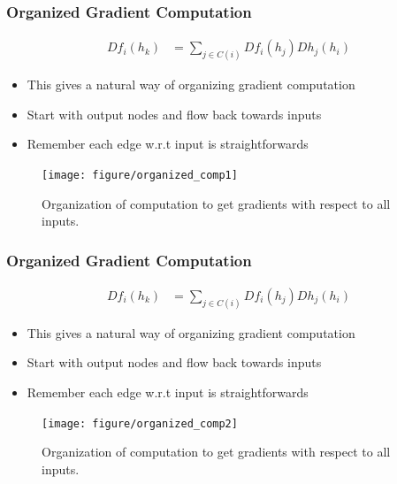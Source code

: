 \documentclass[10pt,mathserif]{beamer}
\begin{document}
\begin{frame}
  \frametitle{Organized Gradient Computation}
  \begin{align*}
    Df_{i}\left(h_k\right) &= \sum_{j \in C\left(i\right)}
    Df_{i}\left(h_{j}\right)Dh_{j}\left(h_{i}\right)
  \end{align*}
  \begin{itemize}
  \item This gives a natural way of organizing gradient computation
  \item Start with output nodes and flow back towards inputs
  \item Remember each edge w.r.t input is straightforwards
  \end{itemize}
  \begin{figure}[ht]
    \centering
    \texttt{[image: figure/organized\_comp1]}
    \caption{Organization of computation to get gradients with respect to all
      inputs. \label{fig:organized_comp1} }
  \end{figure}
\end{frame}

\begin{frame}
  \frametitle{Organized Gradient Computation}
  \begin{align*}
    Df_{i}\left(h_k\right) &= \sum_{j \in C\left(i\right)}
    Df_{i}\left(h_{j}\right)Dh_{j}\left(h_{i}\right)
  \end{align*}
  \begin{itemize}
  \item This gives a natural way of organizing gradient computation
  \item Start with output nodes and flow back towards inputs
  \item Remember each edge w.r.t input is straightforwards
  \end{itemize}
  \begin{figure}[ht]
    \centering
    \texttt{[image: figure/organized\_comp2]}
    \caption{Organization of computation to get gradients with respect to all
      inputs. \label{fig:organized_comp2} }
  \end{figure}
\end{frame}
\end{document}
